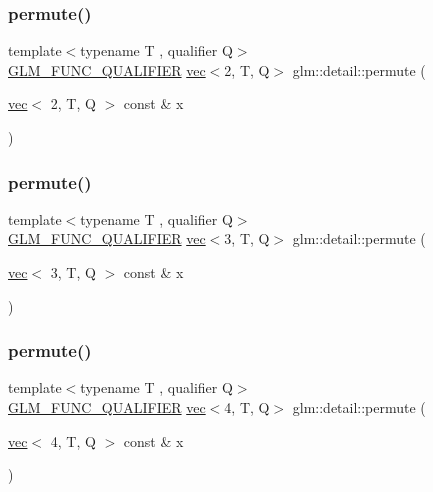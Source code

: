 \mbox{\label{namespaceglm_1_1detail_a442b75a1f3ea4e2660ce0047245581ee}} 
\subsubsection{\texorpdfstring{permute()}{permute()}\hspace{0.1cm}{\footnotesize\ttfamily [2/4]}}
{\footnotesize\ttfamily template$<$typename T , qualifier Q$>$ \\
\hyperlink{setup_8hpp_a33fdea6f91c5f834105f7415e2a64407}{G\+L\+M\+\_\+\+F\+U\+N\+C\+\_\+\+Q\+U\+A\+L\+I\+F\+I\+ER} \hyperlink{structglm_1_1vec}{vec}$<$2, T, Q$>$ glm\+::detail\+::permute (\begin{DoxyParamCaption}\item[{\hyperlink{structglm_1_1vec}{vec}$<$ 2, T, Q $>$ const \&}]{x }\end{DoxyParamCaption})}

\mbox{\label{namespaceglm_1_1detail_aa0f0fcedee25b7de5b7174df40fef4e4}} 
\subsubsection{\texorpdfstring{permute()}{permute()}\hspace{0.1cm}{\footnotesize\ttfamily [3/4]}}
{\footnotesize\ttfamily template$<$typename T , qualifier Q$>$ \\
\hyperlink{setup_8hpp_a33fdea6f91c5f834105f7415e2a64407}{G\+L\+M\+\_\+\+F\+U\+N\+C\+\_\+\+Q\+U\+A\+L\+I\+F\+I\+ER} \hyperlink{structglm_1_1vec}{vec}$<$3, T, Q$>$ glm\+::detail\+::permute (\begin{DoxyParamCaption}\item[{\hyperlink{structglm_1_1vec}{vec}$<$ 3, T, Q $>$ const \&}]{x }\end{DoxyParamCaption})}

\mbox{\label{namespaceglm_1_1detail_a3943594f7c636dd1d021cd23f4e22441}} 
\subsubsection{\texorpdfstring{permute()}{permute()}\hspace{0.1cm}{\footnotesize\ttfamily [4/4]}}
{\footnotesize\ttfamily template$<$typename T , qualifier Q$>$ \\
\hyperlink{setup_8hpp_a33fdea6f91c5f834105f7415e2a64407}{G\+L\+M\+\_\+\+F\+U\+N\+C\+\_\+\+Q\+U\+A\+L\+I\+F\+I\+ER} \hyperlink{structglm_1_1vec}{vec}$<$4, T, Q$>$ glm\+::detail\+::permute (\begin{DoxyParamCaption}\item[{\hyperlink{structglm_1_1vec}{vec}$<$ 4, T, Q $>$ const \&}]{x }\end{DoxyParamCaption})}

